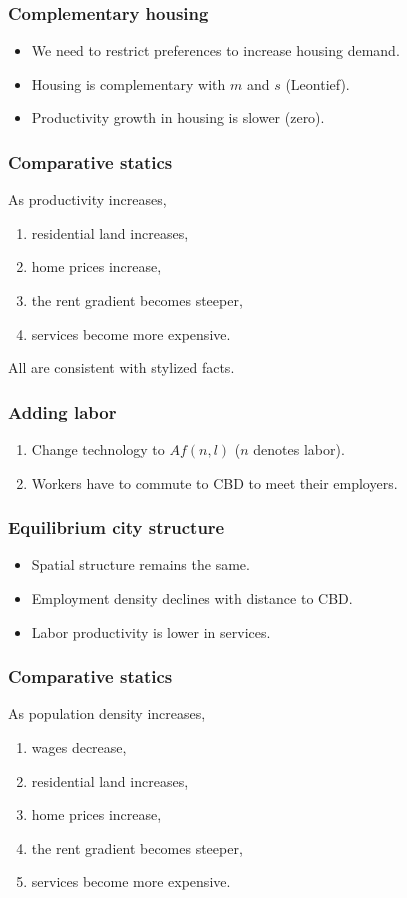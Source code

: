 \documentclass[handout,compress,mathserif]{beamer}
\begin{document}


\begin{frame}\frametitle{Complementary housing}
\begin{itemize}
    \item We need to restrict preferences to increase housing demand.
    \item Housing is complementary with $m$ and $s$ (Leontief).
    \item Productivity growth in housing is slower (zero).
\end{itemize}
\end{frame}



\begin{frame}\frametitle{Comparative statics}
As productivity increases,
\begin{enumerate}
    \item residential land increases,
    \item home prices increase,
    \item the rent gradient becomes steeper,
    \item services become more expensive.
\end{enumerate}
All are consistent with stylized facts.
\end{frame}

\begin{frame}\frametitle{Adding labor}
\begin{enumerate}
    \item Change technology to $Af(n,l)$ ($n$ denotes labor).
    \item Workers have to commute to CBD to meet their employers.
\end{enumerate}
\end{frame}

\begin{frame}\frametitle{Equilibrium city structure}
\begin{itemize}
    \item Spatial structure remains the same.
    \item Employment density declines with distance to CBD.
    \item Labor productivity is lower in services.
\end{itemize}
\end{frame}


\begin{frame}\frametitle{Comparative statics}
As population density increases,
\begin{enumerate}
    \item wages decrease,
    \item residential land increases,
    \item home prices increase,
    \item the rent gradient becomes steeper,
    \item services become more expensive.
\end{enumerate}
\end{frame}
\end{document}
